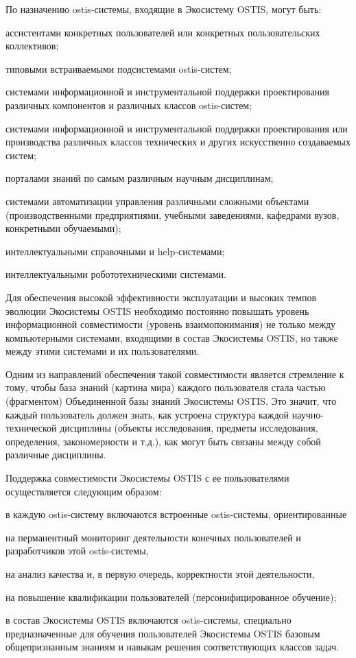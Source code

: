 По назначению ostis-системы, входящие в Экосистему OSTIS, могут быть:
\begin{textitemize}
    \item ассистентами конкретных пользователей или конкретных пользовательских коллективов;
    \item типовыми встраиваемыми подсистемами ostis-систем;
    \item системами информационной и инструментальной поддержки проектирования различных компонентов и различных классов ostis-систем;
    \item системами информационной и инструментальной поддержки проектирования или производства различных классов технических и других искусственно создаваемых систем;
    \item порталами знаний по самым различным научным дисциплинам;
    \item системами автоматизации управления различными сложными объектами (производственными предприятиями, учебными заведениями, кафедрами вузов, конкретными обучаемыми);
    \item интеллектуальными справочными и help-системами;
    \item интеллектуальными робототехническими системами.
\end{textitemize}

Для обеспечения высокой эффективности эксплуатации и высоких темпов эволюции Экосистемы OSTIS необходимо постоянно повышать уровень информационной совместимости (уровень взаимопонимания) не только между компьютерными системами, входящими в состав Экосистемы OSTIS, но также между этими системами и их пользователями. 

Одним из направлений обеспечения такой совместимости является стремление к тому, чтобы база знаний (картина мира) каждого пользователя стала частью (фрагментом) Объединенной базы знаний Экосистемы OSTIS.
Это значит, что каждый пользователь должен знать, как устроена структура каждой научно-технической дисциплины (объекты исследования, предметы исследования, определения, закономерности и т.д.), как могут быть связаны между собой различные дисциплины.

Поддержка совместимости Экосистемы OSTIS с ее пользователями осуществляется следующим образом:
\begin{textitemize}
    \item в каждую ostis-систему включаются встроенные ostis-системы, ориентированные
    \begin{textitemize}
        \item на перманентный мониторинг деятельности конечных пользователей и разработчиков этой ostis-системы,
        \item на анализ качества и, в первую очередь, корректности этой деятельности,
        \item на повышение квалификации пользователей (персонифицированное обучение);
    \end{textitemize}
    \item в состав Экосистемы OSTIS включаются ostis-системы, специально предназначенные для обучения пользователей Экосистемы OSTIS базовым общепризнанным знаниям и навыкам решения соответствующих классов задач.
\end{textitemize}

